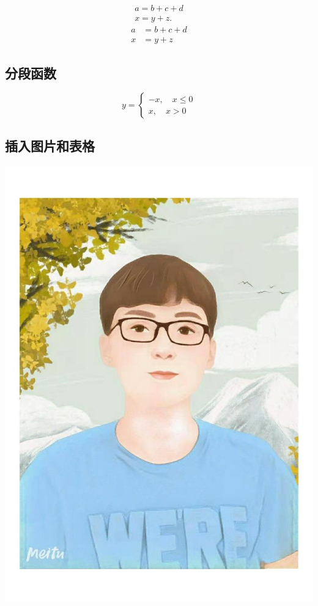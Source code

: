 \documentclass[UTF8]{ctexart}
\begin{document}
\begin{gather*}
a=b+c+d\\
x=y+z
.\end{gather*}
\begin{align*}
a&=b+c+d\\
x&=y+z
\end{align*}    

\subsection{分段函数}
\[y=\begin{cases}
-x,\quad x\leq 0 \\
x, \quad x>0
\end{cases}\]

\subsection{插入图片和表格}
\includegraphics{liu.jpg}
\end{document}
